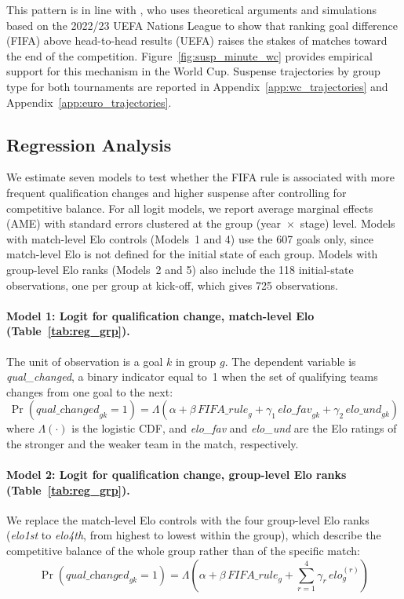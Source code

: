 \documentclass[11pt]{article}
\begin{document}
This pattern is in line with \citet{csato2023avoid}, who uses theoretical arguments and simulations based on the 2022/23 UEFA Nations League to show that ranking goal difference (FIFA) above head-to-head results (UEFA) raises the stakes of matches toward the end of the competition. Figure~\ref{fig:susp_minute_wc} provides empirical support for this mechanism in the World Cup. Suspense trajectories by group type for both tournaments are reported in Appendix~\ref{app:wc_trajectories} and Appendix~\ref{app:euro_trajectories}.





\subsection{Regression Analysis}

We estimate seven models to test whether the FIFA rule is associated with more frequent qualification changes and higher suspense after controlling for competitive balance. For all logit models, we report average marginal effects (AME) with standard errors clustered at the group (year~$\times$~stage) level. Models with match-level Elo controls (Models~1 and 4) use the 607 goals only, since match-level Elo is not defined for the initial state of each group. Models with group-level Elo ranks (Models~2 and 5) also include the 118 initial-state observations, one per group at kick-off, which gives 725 observations.

\paragraph{Model 1: Logit for qualification change, match-level Elo (Table~\ref{tab:reg_grp}).}
The unit of observation is a goal $k$ in group $g$. The dependent variable is \textit{qual\_changed}, a binary indicator equal to~1 when the set of qualifying teams changes from one goal to the next:
\[
\Pr(\textit{qual\_changed}_{gk} = 1)
  = \Lambda\!\left(\alpha + \beta\,\textit{FIFA\_rule}_g
  + \gamma_1\,\textit{elo\_fav}_{gk} + \gamma_2\,\textit{elo\_und}_{gk}\right)
\]
where $\Lambda(\cdot)$ is the logistic CDF, and \textit{elo\_fav} and \textit{elo\_und} are the Elo ratings of the stronger and the weaker team in the match, respectively.

\paragraph{Model 2: Logit for qualification change, group-level Elo ranks (Table~\ref{tab:reg_grp}).}
We replace the match-level Elo controls with the four group-level Elo ranks (\textit{elo1st} to \textit{elo4th}, from highest to lowest within the group), which describe the competitive balance of the whole group rather than of the specific match:
\[
\Pr(\textit{qual\_changed}_{gk} = 1)
  = \Lambda\!\left(\alpha + \beta\,\textit{FIFA\_rule}_g
  + \sum_{r=1}^{4} \gamma_r\,\textit{elo}^{(r)}_g\right)
\]
\end{document}
